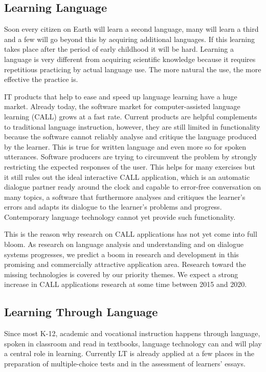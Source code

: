 \begin{multicols}{2}
\subsection{Learning Language}
\label{sec:learning-language}

Soon every citizen on Earth will learn a second language, many will learn a third and a few will go beyond this by acquiring additional languages. If this learning takes place after the period of early childhood it will be hard. Learning a language is very different from acquiring scientific knowledge because it requires repetitious practicing by actual language use. The more natural the use, the more effective the practice is.
 
IT products that help to ease and speed up language learning have a huge market. Already today, the software market for computer-assisted language learning (CALL) grows at a fast rate. Current products are helpful complements to traditional language instruction, however, they are still limited in functionality because the software cannot reliably analyse and critique the language produced by the learner. This is true for written language and even more so for spoken utterances. Software producers are trying to circumvent the problem by strongly restricting the expected responses of the user. This helps for many exercises but it still rules out the ideal interactive CALL application, which is an automatic dialogue partner ready around the clock and capable to error-free conversation on many topics, a software that furthermore analyses and critiques the learner’s errors and adapts its dialogue to the learner’s problems and progress. Contemporary language technology cannot yet provide such functionality.
 
This is the reason why research on CALL applications has not yet come into full bloom. As research on language analysis and understanding and on dialogue systems progresses, we predict a boom in research and development in this promising and commercially attractive application area. Research toward the missing technologies is covered by our priority themes. We expect a strong increase in CALL applications research at some time between 2015 and 2020.

\subsection{Learning Through Language}
\label{sec:learn-thro-lang}

Since most K-12, academic and vocational instruction happens through language, spoken in classroom and read in textbooks, language technology can and will play a central role in learning. Currently LT is already applied at a few places in the preparation of multiple-choice tests and in the assessment of learners’ essays.
 

\end{multicols}
